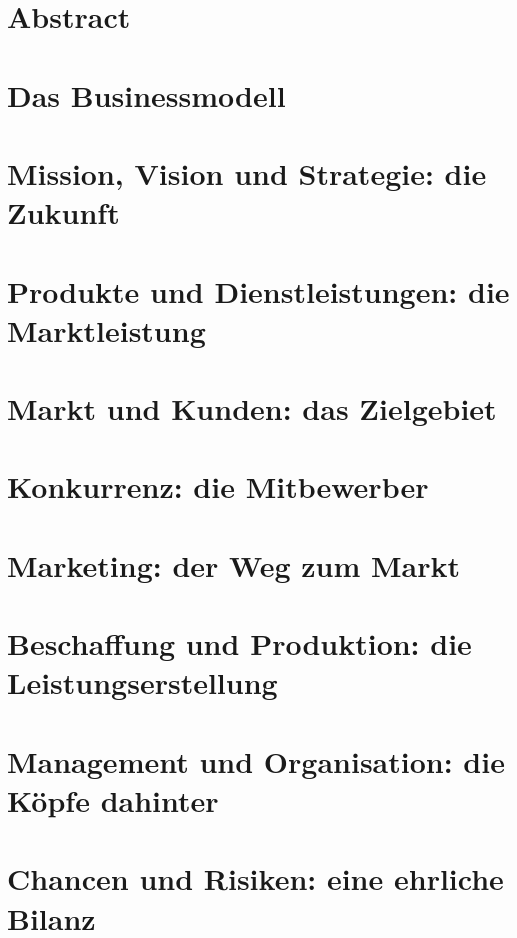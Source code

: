 

\newcommand{\SUBJECT}{Businessplan}
\newcommand{\TITLE}{Digital Fitness Coach}



\section{Abstract}

\section{Das Businessmodell} %

\section{Mission, Vision und Strategie: die Zukunft}

\section{Produkte und Dienstleistungen: die Marktleistung}

\section{Markt und Kunden: das Zielgebiet}

\section{Konkurrenz: die Mitbewerber}

\section{Marketing: der Weg zum Markt}

\section{Beschaffung und Produktion: die Leistungserstellung}

\section{Management und Organisation: die Köpfe dahinter}

\section{Chancen und Risiken: eine ehrliche Bilanz}

